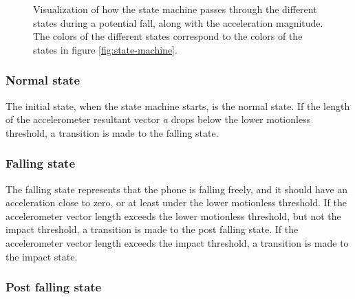 \documentclass[12pt, a4paper, onecolumn]{article}
\begin{document}
	\begin{figure}[H]
		\centering
		\caption{Visualization of how the state machine passes through the different states during a potential fall, along with the acceleration magnitude. The colors of the different states correspond to the colors of the states in figure \ref{fig:state-machine}.}%
		\label{fig:fall-data-state-machine}%
	\end{figure}
	
	\subsubsection{Normal state}
	
	The initial state, when the state machine starts, is the normal state. If the length of the accelerometer resultant vector \textit{a} drops below the lower motionless threshold, a transition is made to the falling state.
	
	\subsubsection{Falling state}
	
	The falling state represents that the phone is falling freely, and it should have an acceleration close to zero, or at least under the lower motionless threshold. If the accelerometer vector length exceeds the lower motionless threshold, but not the impact threshold, a transition is made to the post falling state. If the accelerometer vector length exceeds the impact threshold, a transition is made to the impact state.
	
	\subsubsection{Post falling state}
	
\end{document}

